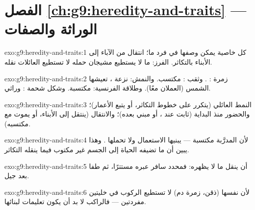 \section*{الفصل \ref{ch:g9:heredity-and-traits} --- الوراثة والصفات}

\begin{solution}{exo:g9:heredity-and-traits:1}
 كل خاصية يمكن وصفها في فرد ما؛  انتقال
 من الآباء إلى الأبناء بالتكاثر.  الفرز: ما لا
يستطيع مشيجان حمله لا تستطيع العائلات نقله.
\end{solution}

\begin{solution}{exo:g9:heredity-and-traits:2}
زمرة : . وثقب : مكتسب. والنمش: نزعة
، تعيشها الشمس (العملان معًا). وطلاقة الفرنسية:
مكتسبة. وشكل شحمة : وراثي.
\end{solution}

\begin{solution}{exo:g9:heredity-and-traits:3}
النمط العائلي (يتكرر على خطوط التكاثر، أو يتبع
الأعمار)؛ والحضور منذ البداية (ثابت عند ، أو
مبني بعده)؛ والانتقال (ينتقل إلى الأبناء، أو يموت مع
مكتسبه).
\end{solution}

\begin{solution}{exo:g9:heredity-and-traits:4}
لأن  المدرَّبة مكتسبة --- يبنيها الاستعمال ولا
تحملها . وهذا يبين أن ما تضيفه الحياة إلى الجسم
غير مكتوب فيما ينقله التكاثر.
\end{solution}

\begin{solution}{exo:g9:heredity-and-traits:5}
أن ينقل ما لا يظهره: فمحدد  سافر عبره مستترًا، ثم
طفا بعد جيل.
\end{solution}

\begin{solution}{exo:g9:heredity-and-traits:6}
لأن  نفسها (ذقن، زمرة دم) لا تستطيع الركوب في
خليتين مفردتين --- فالراكب لا بد أن يكون تعليمات
لبنائها.
\end{solution}

